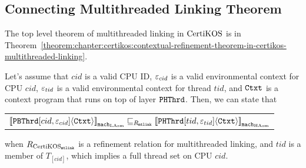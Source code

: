 \subsection{Connecting Multithreaded Linking Theorem}
\label{chapter:certikos:subsec:connecting-multithreaded-theroem}

The top level theorem of
multithreaded linking in $\mathrm{CertiKOS}$  is in Theorem~\ref{theorem:chapter:certikos:contextual-refinement-theorem-in-certikos-multithreaded-linking}.

\begin{theorem}
\label{theorem:chapter:certikos:contextual-refinement-theorem-in-certikos-multithreaded-linking}
Let's assume that $cid$ is a valid CPU ID, ${\varepsilon}_{cid}$ is a valid
environmental context for CPU $cid$, 
${\varepsilon}_{tid}$ is a valid
environmental context for thread $tid$, 
and ${\mathrm{\texttt{Ctxt}}}$ is a
 context program that runs on top of layer ${\mathrm{\texttt{PHThrd}}}$. 
 Then, we can state that
 \begin{center}
\begin{tabular}{c}
${[\![{{\mathrm{\texttt{PBThrd}}}[cid, {\varepsilon}_{cid}]} \langle {{\mathrm{\texttt{Ctxt}}}} \rangle]\!]}_{{\mathrm{\texttt{mach}}}_{\mathrm{LAsm}}} \sqsubseteq_{R_{{\mathrm{\texttt{mtlink}}}}} {[\![{{\mathrm{\texttt{PHThrd}}}[tid, {\varepsilon}_{tid}]} \langle {{\mathrm{\texttt{Ctxt}}}} \rangle]\!]}_{{{\mathrm{\texttt{mach}}}_{\mathrm{HAsm}}}}$\\
\end{tabular}
\end{center}
when ${R_{\mathrm{CertiKOS}_{\mathrm{\texttt{mtlink}}}}}$ is a refinement relation for multithreaded linking, and $tid$ is a member of $T_{[cid]}$,
which implies a full thread set on CPU $cid$.
\end{theorem}


